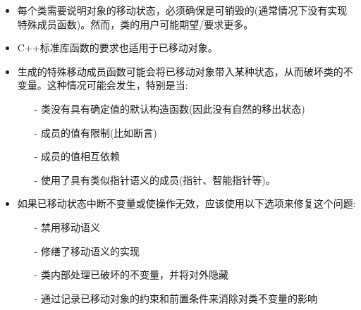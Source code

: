 \begin{itemize}
	\item 每个类需要说明对象的移动状态，必须确保是可销毁的(通常情况下没有实现特殊成员函数)。然而，类的用户可能期望/要求更多。
	\item C++标准库函数的要求也适用于已移动对象。
	\item 生成的特殊移动成员函数可能会将已移动对象带入某种状态，从而破坏类的不变量。这种情况可能会发生，特别是当:
	\begin{itemize}
		\item[-] 类没有具有确定值的默认构造函数(因此没有自然的移出状态)
		\item[-] 成员的值有限制(比如断言)
		\item[-] 成员的值相互依赖
		\item[-] 使用了具有类似指针语义的成员(指针、智能指针等)。
	\end{itemize}
	\item 如果已移动状态中断不变量或使操作无效，应该使用以下选项来修复这个问题:
	\begin{itemize}
		\item[-] 禁用移动语义
		\item[-] 修缮了移动语义的实现
		\item[-] 类内部处理已破坏的不变量，并将对外隐藏
		\item[-] 通过记录已移动对象的约束和前置条件来消除对类不变量的影响
	\end{itemize}
\end{itemize}


\newpage